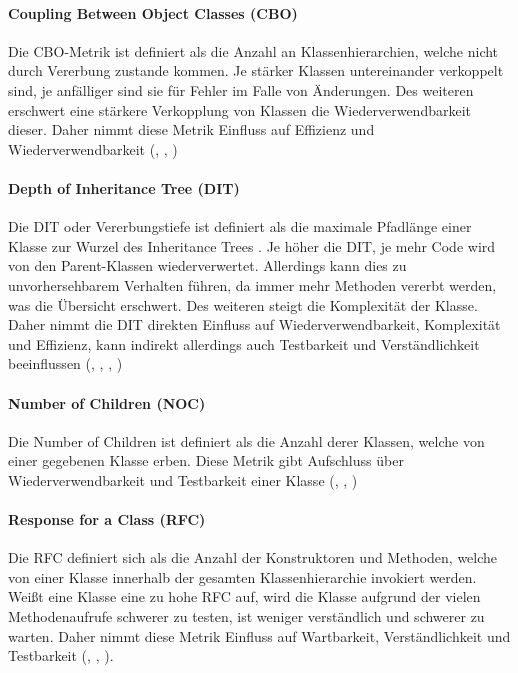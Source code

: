 \documentclass[a4paper, 12pt]{article}
\begin{document}
\paragraph{Coupling Between Object Classes (CBO)}
Die CBO-Metrik ist definiert als die Anzahl an Klassenhierarchien, welche nicht durch Vererbung zustande kommen.
Je stärker Klassen untereinander verkoppelt sind, je anfälliger sind sie für Fehler im Falle von Änderungen.
Des weiteren erschwert eine stärkere Verkopplung von Klassen die Wiederverwendbarkeit dieser.
Daher nimmt diese Metrik Einfluss auf Effizienz und Wiederverwendbarkeit (\textcite{Metrics_OO_design}, \textcite{Linda_softwarequality}, \textcite{Lorenz_object_oriented_software_metrics})

\paragraph{Depth of Inheritance Tree (DIT)}
Die DIT oder Vererbungstiefe ist definiert als die maximale Pfadlänge einer Klasse zur Wurzel des Inheritance Trees \parencite{Metrics_OO_design}.
Je höher die DIT, je mehr Code wird von den Parent-Klassen wiederverwertet.
Allerdings kann dies zu unvorhersehbarem Verhalten führen, da immer mehr Methoden vererbt werden, was die Übersicht erschwert.
Des weiteren steigt die Komplexität der Klasse.
Daher nimmt die DIT direkten Einfluss auf Wiederverwendbarkeit, Komplexität und Effizienz, kann indirekt allerdings auch Testbarkeit und Verständlichkeit beeinflussen (\textcite{Metrics_OO_design}, \textcite{Linda_softwarequality}, \textcite{Lorenz_object_oriented_software_metrics}, \textcite{Code_metrics_dit_microsoft})

\paragraph{Number of Children (NOC)}
Die Number of Children ist definiert als die Anzahl derer Klassen, welche von einer gegebenen Klasse erben. Diese Metrik gibt Aufschluss über Wiederverwendbarkeit und Testbarkeit einer Klasse (\textcite{Metrics_OO_design}, \textcite{Linda_softwarequality}, \textcite{ukessays_2018})

\paragraph{Response for a Class (RFC)}
Die RFC definiert sich als die Anzahl der Konstruktoren und Methoden, welche von einer Klasse innerhalb der gesamten Klassenhierarchie invokiert werden.
Weißt eine Klasse eine zu hohe RFC auf, wird die Klasse aufgrund der vielen Methodenaufrufe schwerer zu testen, ist weniger verständlich und schwerer zu warten.
Daher nimmt diese Metrik Einfluss auf Wartbarkeit, Verständlichkeit und Testbarkeit (\textcite{Metrics_OO_design}, \textcite{Linda_softwarequality}, \textcite{ukessays_2018}).
\end{document}
